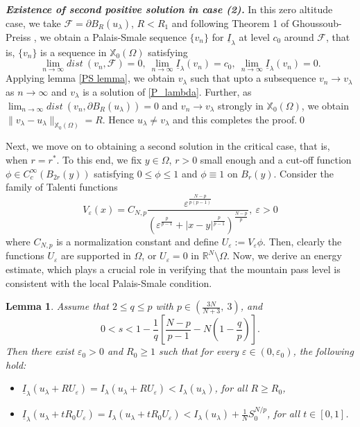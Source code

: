 \documentclass[reqno,oneside]{amsart}
\newtheorem{lemma}[theorem]{Lemma}
\theoremstyle{definition}
\theoremstyle{remark}
\numberwithin{equation}{section}
\newcommand{\Om} {\Omega}
\newcommand{\bdry}{\mathbb{R}^N \setminus \Omega}
\newcommand{\pa}{\partial}
\newcommand{\rar}{\rightarrow}
\newcommand{\xo}{\mathbb{X}_0}
\newcommand{\ti}{\underline{I}_{\la}}
\newcommand{\ue}{U_{\varepsilon}}
\newcommand{\la} {\lambda}
\begin{document}
\noindent\textit{\textbf{Existence of second positive solution in case (2).}} In this zero altitude case, we take $\mathcal{F} = \pa B_{R} (u_{\la})$, $R<R_1$ and following Theorem 1 of Ghoussoub-Preiss \cite{ghoussoub1989mountain}, we obtain a Palais-Smale sequence $\{v_n\}$ for $\ti$ at level $c_0$ around $\mathcal{F}$, that is, $\{v_n\}$ is a sequence in $\xo(\Om)$ satisfying
\[\lim_{n\rar\infty} dist\ (v_n, \mathcal{F}) =0,\ \lim_{n\rar\infty} \underline{I}_{\la} (v_n) = c_0,\ \lim_{n\rar\infty} \underline{I}_{\la} (v_n) =0.\]
Applying lemma \ref{PS lemma}, we obtain $v_{\la}$ such that upto a subsequence $v_n \rar v_{\la}$ as $n\rar\infty$ and $v_{\la}$ is a solution of \eqref{P_lambda}. Further, as $\lim_{n\rar\infty} dist\ (v_n, \pa B_R (u_{\la})) =0$ and $v_n \rar v_{\la}$ strongly in $\xo(\Om)$, we obtain $\|v_{\la} - u_{\la}\|_{\xo(\Om)}=R$. Hence $u_{\la} \not= v_{\la}$ and this completes the proof.\hfill\qed

Next, we move on to obtaining a second solution in the critical case, that is, when $r=r^*$. To this end, we fix $y\in\Om$, $r>0$ small enough and a cut-off function $\phi\in C_c^{\infty} \left(B_{2r}(y) \right)$ satisfying $0\leq \phi \leq 1$ and $\phi \equiv 1$ on $B_r(y)$. Consider the family of Talenti functions
\begin{equation}
    V_{\varepsilon} (x) = C_{N,p} \frac{\varepsilon^{\frac{N-p}{p(p-1)}}}{\left( \varepsilon^{\frac{p}{p-1}} + |x-y|^{\frac{p}{p-1}} \right)^{\frac{N-p}{p}}},\ \varepsilon>0
\end{equation}
where $C_{N,p}$ is a normalization constant and define $U_{\varepsilon} := V_{\varepsilon} \phi$. Then, clearly the functions $\ue$ are supported in $\Om$, or $\ue =0$ in $\bdry$. Now, we derive an energy estimate, which plays a crucial role in verifying that the mountain pass level is consistent with the local Palais-Smale condition.

\begin{lemma}\label{estimate_for_talenti_functions}
    Assume that $2\leq q\leq p$ with $p \in \left( \frac{3N}{N+3},\ 3 \right)$,  
    and
    \[0<s< 1- \frac{1}{q} \left[ \frac{N-p}{p-1} - N \left( 1- \frac{q}{p} \right) \right]. \]
    Then there exist $\varepsilon_0 >0$ and $R_0 \geq 1$ such that for every $\varepsilon \in (0, \varepsilon_0)$, the following hold:
    \begin{itemize}
        \item[\textit{(a)}] $\ti \left(u_{\la} + R\ue \right) = I_{\la} \left( u_{\la} + R\ue\right) < I_{\la} \left( u_{\la} \right)$, for all $R\geq R_0$,
        \item[\textit{(b)}] $\ti \left(u_{\la} + tR_0 \ue \right) = I_{\la} \left( u_{\la} + t R_0 \ue\right) < I_{\la} \left( u_{\la} \right) + \frac{1}{N} S_0^{N/p}$, for all $t\in[0,1]$.
    \end{itemize}
\end{lemma}
\end{document}
